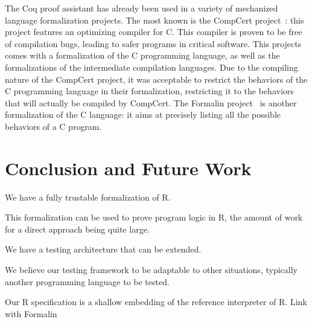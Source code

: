 \documentclass[
    sigplan,
    10pt,
    review, %
    natbib=false %
 ]{acmart}
\begin{document}
The Coq proof assistant has already been used
in a variety of mechanized language formalization projects.
The most known is the CompCert project~\cite{Leroy-Compcert-CACM}:
this project features an optimizing compiler for C.
This compiler is proven to be free of compilation bugs,
leading to safer programs in critical software.
This projects comes with a formalization of the C programming language,
as well as the formalizations of the intermediate compilation languages.
%
Due to the compiling nature of the CompCert project,
it was acceptable to restrict the behaviors of the C programming language
in their formalization,
restricting it to the behaviors that will actually be compiled by CompCert.
The Formalin project~\parencite{formalin} is another formalization
of the C language:
it aims at precisely listing all the possible behaviors of a C program.

\section{Conclusion and Future Work}
\label{sec:conclusion}

\todo{}

We have a fully trustable formalization of R.

This formalization can be used to prove program logic in R,
the amount of work for a direct approach being quite large.

We have a testing architecture that can be extended.

We believe our testing framework to be adaptable to other situations,
typically another programming language to be tested.

Our R specification is a shallow embedding of the reference interpreter of R.
Link with Formalin

\printbibliography{}
\end{document}

